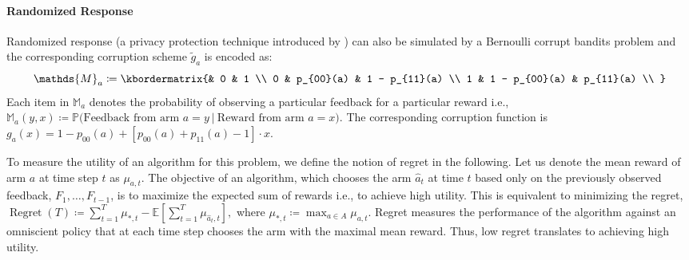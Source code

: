 \documentclass[letterpaper]{article} %
\newcommand{\ind}{\mathds{1}}
\newcommand{\bE}{\mathds{E}}
\newcommand{\Regret}{\operatorname{Regret}}
\newcommand{\ArmAt}{\hat{a}}
\newcommand{\defined}{\coloneqq}
\newcommand{\IsEqual}{=}
\newcommand\given[1][]{\:#1\vert\:}
\newcommand{\optMean}[1]{\mu_{*, #1}}
\newcommand{\meanReward}[2]{\mu_{#1, #2}}
\begin{document}
\paragraph{Randomized Response}
Randomized response (a privacy protection technique introduced by \cite{Warner1965}) can also be simulated by a Bernoulli corrupt bandits problem and the corresponding corruption scheme $\tilde{g}_a$ is encoded as:
\begin{equation}
\label{eq:CorruptionMatrix}
  \mathds{M}_{a} \defined \kbordermatrix{%
      & 0  & 1  \\
    0 & p_{00}(a) & 1 - p_{11}(a) \\
    1 & 1 - p_{00}(a) & p_{11}(a) \\
  }
\end{equation}
Each item in $\mathds{M}_{a}$ denotes the probability of observing a particular feedback 
for a particular reward i.e.,
$
    \mathds{M}_a(y,x) \defined \mathds{P} \big( \text{Feedback from arm } a \IsEqual  y 
      \given
     \text{Reward from arm } a \IsEqual x \big).
$
The corresponding corruption function is $g_a(x) =  1 - p_{00}(a) + [p_{00}(a) + p_{11}(a) - 1]\cdot{} x.$


To measure the utility of an algorithm for this problem, we define the notion of regret in the following. Let us denote the mean reward of arm $a$ at time step $t$ as $\meanReward{a}{t}$. The objective of an algorithm, which chooses the arm $\ArmAt_{t}$ at time $t$ based only on the previously observed feedback, $F_1,\dots,F_{t-1}$, is to maximize the expected sum of rewards i.e., to achieve high utility. This is equivalent to minimizing the regret, 
$
\Regret(T) \defined \sum_{t=1}^{T} \optMean{t} - \bE\left[\sum_{t=1}^{T}\meanReward{\hat{a}_t}{t}\right],$
where $\optMean{t} \defined \max_{a \in A} \meanReward{a}{t}$.
Regret measures the performance of the algorithm against an omniscient policy that at each time step chooses the arm with the maximal mean reward. Thus, low regret translates to achieving high utility.
\end{document}
